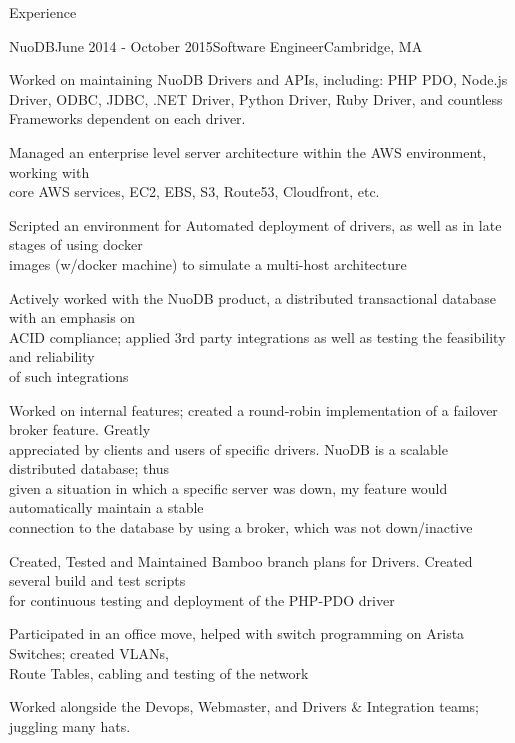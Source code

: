 \documentclass{resume} %
\begin{document}
\begin{rSection}{Experience}
\begin{rSubsection}{NuoDB}{June 2014 - October 2015}{Software Engineer}{Cambridge, MA}
 \item Worked on maintaining NuoDB Drivers and APIs, including: PHP PDO, Node.js Driver, ODBC, JDBC, .NET Driver, Python Driver, Ruby Driver, and countless Frameworks dependent on each driver. 
	      \item Managed an enterprise level server architecture within the AWS environment, working with 
	      \\core AWS services, EC2, EBS, S3, Route53, Cloudfront, etc. 
          \item Scripted an environment for Automated deployment of drivers, as well as in late stages of using docker\\ images (w/docker machine) to simulate a multi-host architecture
          \item Actively worked with the NuoDB product, a distributed transactional database with an emphasis on\\ ACID compliance; applied 3rd party integrations as well as testing the feasibility and reliability\\ of such integrations
   	\item Worked on internal features; created a round-robin implementation of a failover broker feature. Greatly \\appreciated by clients and users of specific drivers. NuoDB is a scalable distributed database; thus\\ given a situation in which a specific server was down, my feature would automatically maintain a stable\\ connection to the database by using a broker, which was not down/inactive
          \item Created, Tested and Maintained Bamboo branch plans for Drivers. Created several build and test scripts\\ for continuous testing and deployment of the PHP-PDO driver
          \item Participated in an office move, helped with switch programming on Arista Switches; created VLANs, \\Route Tables, cabling and testing of the network
          \item Worked alongside the Devops, Webmaster, and Drivers \& Integration teams; juggling many hats.
\end{rSubsection}



\end{rSection}
\end{document}
